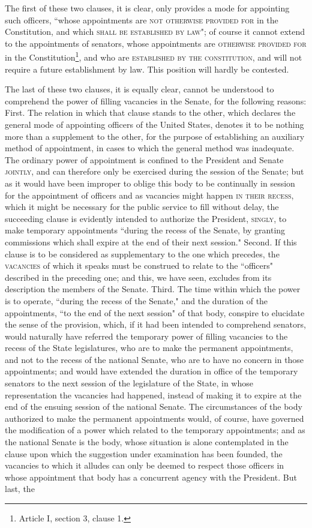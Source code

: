 The first of these two clauses, it is clear, only provides a mode for appointing such officers, ``whose appointments are \textsc{not otherwise provided for} in the Constitution, and which \textsc{shall be established by law}"; of course it cannot extend to the appointments of senators, whose appointments are \textsc{otherwise provided for} in the Constitution\footnote{Article I, section 3, clause 1.}, and who are \textsc{established by the constitution}, and will not require a future establishment by law. This position will hardly be contested.

The last of these two clauses, it is equally clear, cannot be understood to comprehend the power of filling vacancies in the Senate, for the following reasons: First. The relation in which that clause stands to the other, which declares the general mode of appointing officers of the United States, denotes it to be nothing more than a supplement to the other, for the purpose of establishing an auxiliary method of appointment, in cases to which the general method was inadequate. The ordinary power of appointment is confined to the President and Senate \textsc{jointly}, and can therefore only be exercised during the session of the Senate; but as it would have been improper to oblige this body to be continually in session for the appointment of officers and as vacancies might happen \textsc{in their recess}, which it might be necessary for the public service to fill without delay, the succeeding clause is evidently intended to authorize the President, \textsc{singly}, to make temporary appointments ``during the recess of the Senate, by granting commissions which shall expire at the end of their next session." Second. If this clause is to be considered as supplementary to the one which precedes, the \textsc{vacancies} of which it speaks must be construed to relate to the ``officers" described in the preceding one; and this, we have seen, excludes from its description the members of the Senate. Third. The time within which the power is to operate, ``during the recess of the Senate," and the duration of the appointments, ``to the end of the next session" of that body, conspire to elucidate the sense of the provision, which, if it had been intended to comprehend senators, would naturally have referred the temporary power of filling vacancies to the recess of the State legislatures, who are to make the permanent appointments, and not to the recess of the national Senate, who are to have no concern in those appointments; and would have extended the duration in office of the temporary senators to the next session of the legislature of the State, in whose representation the vacancies had happened, instead of making it to expire at the end of the ensuing session of the national Senate. The circumstances of the body authorized to make the permanent appointments would, of course, have governed the modification of a power which related to the temporary appointments; and as the national Senate is the body, whose situation is alone contemplated in the clause upon which the suggestion under examination has been founded, the vacancies to which it alludes can only be deemed to respect those officers in whose appointment that body has a concurrent agency with the President. But last, the 